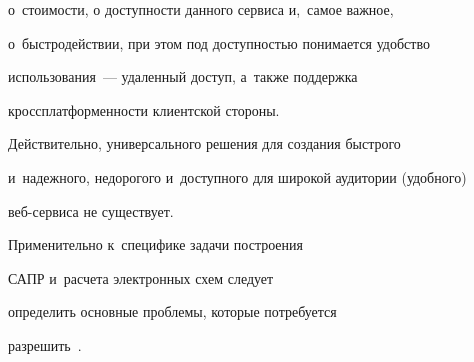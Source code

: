 о~стоимости, о доступности данного сервиса и,~самое важное, 


о~быстродействии, при этом под доступностью понимается удобство 


использования~--- удаленный доступ, а~так\-же поддержка 


кроссплатформенности клиентской стороны. 


     


     Действительно, универсального решения для создания быстрого 


и~надежного, недорогого и~доступного для широкой аудитории (удобного) 


веб-сервиса не существует.


     


Применительно к~специфике задачи построения 


САПР и~расчета электронных схем следует 


определить основные проблемы, которые потребуется  


разрешить~\cite{1-gr}.


